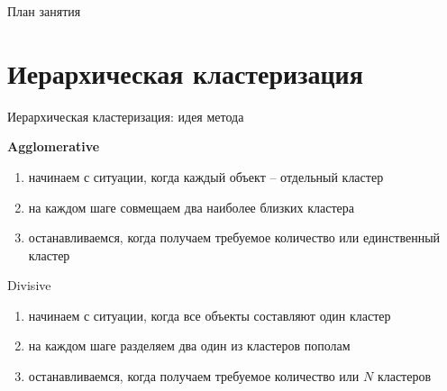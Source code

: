 \documentclass[10pt]{beamer}
\begin{document}
\begin{frame}{План занятия}
\tableofcontents
\end{frame}


\section{Иерархическая кластеризация}


\begin{frame}{Иерархическая кластеризация: идея метода}

{\bf Agglomerative}
\begin{enumerate}
\item начинаем с ситуации, когда каждый объект -- отдельный кластер
\item на каждом шаге совмещаем два наиболее близких кластера
\item останавливаемся, когда получаем требуемое количество или единственный кластер
\end{enumerate}

\vspace{1em}
Divisive
\begin{enumerate}
\item начинаем с ситуации, когда все объекты составляют один кластер
\item на каждом шаге разделяем два один из кластеров пополам
\item останавливаемся, когда получаем требуемое количество или $N$ кластеров
\end{enumerate}

\end{frame}
\end{document}
